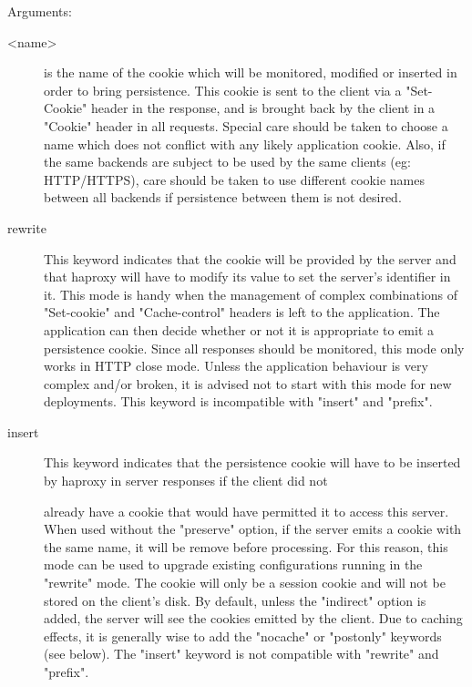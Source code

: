   Arguments:
  \begin{description}
  \item[<name>]    is the name of the cookie which will be monitored, modified or
              inserted in order to bring persistence. This cookie is sent to
              the client via a "Set-Cookie" header in the response, and is
              brought back by the client in a "Cookie" header in all requests.
              Special care should be taken to choose a name which does not
              conflict with any likely application cookie. Also, if the same
              backends are subject to be used by the same clients (eg:
              HTTP/HTTPS), care should be taken to use different cookie names
              between all backends if persistence between them is not desired.

  \item[rewrite]   This keyword indicates that the cookie will be provided by the
              server and that haproxy will have to modify its value to set the
              server's identifier in it. This mode is handy when the management
              of complex combinations of "Set-cookie" and "Cache-control"
              headers is left to the application. The application can then
              decide whether or not it is appropriate to emit a persistence
              cookie. Since all responses should be monitored, this mode only
              works in HTTP close mode. Unless the application behaviour is
              very complex and/or broken, it is advised not to start with this
              mode for new deployments. This keyword is incompatible with
              "insert" and "prefix".

  \item[insert]    This keyword indicates that the persistence cookie will have to
              be inserted by haproxy in server responses if the client did not

              already have a cookie that would have permitted it to access this
              server. When used without the "preserve" option, if the server
              emits a cookie with the same name, it will be remove before
              processing.  For this reason, this mode can be used to upgrade
              existing configurations running in the "rewrite" mode. The cookie
              will only be a session cookie and will not be stored on the
              client's disk. By default, unless the "indirect" option is added,
              the server will see the cookies emitted by the client. Due to
              caching effects, it is generally wise to add the "nocache" or
              "postonly" keywords (see below). The "insert" keyword is not
              compatible with "rewrite" and "prefix".


\end{description}
